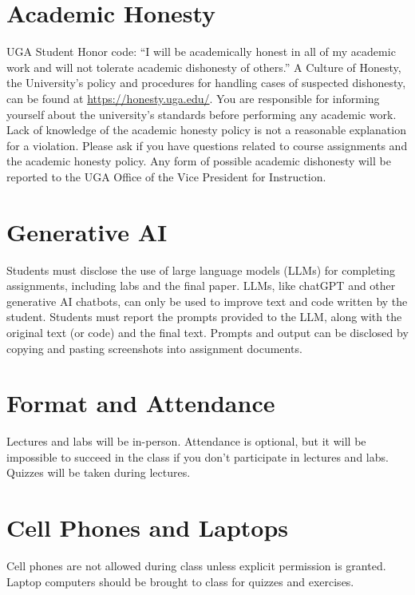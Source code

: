 \documentclass[12pt]{article}
\begin{document}
\vspace{-2mm}
\section*{\normalsize Academic Honesty}
\vspace{-4mm}

UGA Student Honor code: ``I will be academically honest in all of my
academic work and will not tolerate academic dishonesty of others.'' A
Culture of Honesty, the University's policy and procedures for
handling cases of suspected dishonesty, can be found at
\url{https://honesty.uga.edu/}. You are responsible for 
informing yourself about the university's standards before performing
any academic work. Lack of knowledge of the academic honesty policy is
not a reasonable explanation for a violation. Please ask if you have
questions related to course assignments and the academic honesty
policy. Any form of possible academic dishonesty will be reported to
the UGA Office of the Vice President for Instruction.

\clearpage

\section*{\normalsize Generative AI}
\vspace{-4mm}

Students must disclose the use of large language models (LLMs) for
completing assignments, including labs and the final paper. LLMs, like
chatGPT and other generative AI chatbots, can only be used to improve
text and code written by the student. Students must report the prompts
provided to the LLM, along with the original text (or code) and
the final text. Prompts and output can be disclosed by copying and
pasting screenshots into assignment documents. 


\vspace{-12pt}
\section*{\normalsize Format and Attendance}
\vspace{-4mm}
Lectures and labs will be in-person. Attendance is optional, but it
will be impossible to succeed in the class if you don't participate in
lectures and labs. Quizzes will be taken during lectures. 

\vspace{-12pt}
\section*{\normalsize Cell Phones and Laptops}
\vspace{-4mm}
Cell phones are not allowed during class unless explicit permission is
granted. Laptop computers should be brought to class for quizzes and
exercises.
\end{document}
